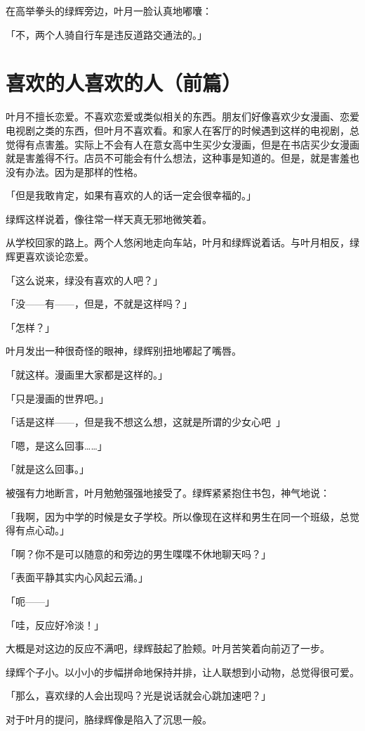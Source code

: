 \documentclass[UTF8]{ctexart}
\begin{document}
    在高举拳头的绿辉旁边，叶月一脸认真地嘟囔：

    「不，两个人骑自行车是违反道路交通法的。」
    \section{喜欢的人喜欢的人（前篇）}
    叶月不擅长恋爱。不喜欢恋爱或类似相关的东西。朋友们好像喜欢少女漫画、恋爱电视剧之类的东西，但叶月不喜欢看。和家人在客厅的时候遇到这样的电视剧，总觉得有点害羞。实际上不会有人在意女高中生买少女漫画，但是在书店买少女漫画就是害羞得不行。店员不可能会有什么想法，这种事是知道的。但是，就是害羞也没有办法。因为是那样的性格。

    「但是我敢肯定，如果有喜欢的人的话一定会很幸福的。」

    绿辉这样说着，像往常一样天真无邪地微笑着。

    从学校回家的路上。两个人悠闲地走向车站，叶月和绿辉说着话。与叶月相反，绿辉更喜欢谈论恋爱。

    「这么说来，绿没有喜欢的人吧？」

    「没——有——，但是，不就是这样吗？」

    「怎样？」

    叶月发出一种很奇怪的眼神，绿辉别扭地嘟起了嘴唇。

    「就这样。漫画里大家都是这样的。」

    「只是漫画的世界吧。」

    「话是这样——，但是我不想这么想，这就是所谓的少女心吧~」

    「嗯，是这么回事……」

    「就是这么回事。」

    被强有力地断言，叶月勉勉强强地接受了。绿辉紧紧抱住书包，神气地说：

    「我啊，因为中学的时候是女子学校。所以像现在这样和男生在同一个班级，总觉得有点心动。」

    「啊？你不是可以随意的和旁边的男生喋喋不休地聊天吗？」

    「表面平静其实内心风起云涌。」

    「呃——」

    「哇，反应好冷淡！」

    大概是对这边的反应不满吧，绿辉鼓起了脸颊。叶月苦笑着向前迈了一步。

    绿辉个子小。以小小的步幅拼命地保持并排，让人联想到小动物，总觉得很可爱。

    「那么，喜欢绿的人会出现吗？光是说话就会心跳加速吧？」

    对于叶月的提问，胳绿辉像是陷入了沉思一般。
\end{document}
